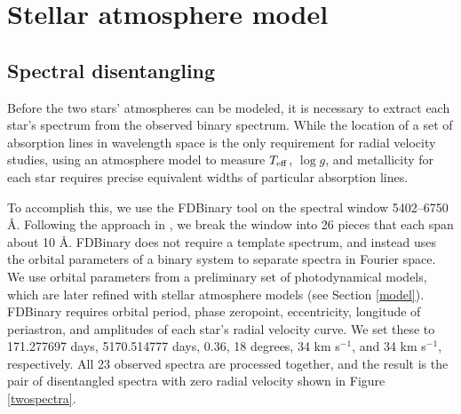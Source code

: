 \section{Stellar atmosphere model}\label{atm}

\subsection{Spectral disentangling}\label{disentangle}
Before the two stars' atmospheres can be modeled, it is necessary to extract each star's spectrum from the observed binary spectrum. While the location of a set of absorption lines in wavelength space is the only requirement for radial velocity studies, using an atmosphere model to measure $T_{\rm{eff}}$, $\log g$, and metallicity for each star requires precise equivalent widths of particular absorption lines.

To accomplish this, we use the FDBinary tool \citep{ili04} on the spectral window 5402--6750 \AA. Following the approach in \citet{bec14}, we break the window into 26 pieces that each span about 10 \AA. FDBinary does not require a template spectrum, and instead uses the orbital parameters of a binary system to separate spectra in Fourier space. We use orbital parameters from a preliminary set of photodynamical models, which are later refined with stellar atmosphere models (see Section \ref{model}). FDBinary requires orbital period, phase zeropoint, eccentricity, longitude of periastron, and amplitudes of each star's radial velocity curve. We set these to 171.277697 days, 5170.514777 days, 0.36, 18 degrees, 34 km s$^{-1}$, and 34 km s$^{-1}$, respectively. All 23 observed spectra are processed together, and the result is the pair of disentangled spectra with zero radial velocity shown in Figure \ref{twospectra}.
